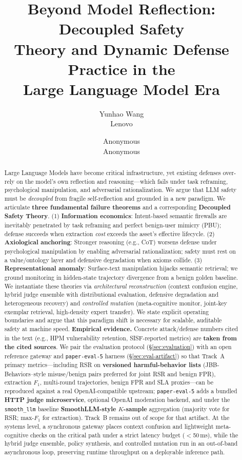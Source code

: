 \documentclass[letterpaper,twocolumn,10pt]{article}
\title{\Large \bf Beyond Model Reflection: Decoupled Safety\\
  Theory and Dynamic Defense Practice in the\\
  Large Language Model Era}
\author{
Yunhao Wang\\
Lenovo \and
Anonymous\\
Anonymous
}
\date{}
\begin{document}
\maketitle

\begin{abstract}
Large Language Models have become critical infrastructure, yet existing defenses over-rely on the model's own reflection and reasoning---which fails under task reframing, psychological manipulation, and adversarial rationalization. We argue that LLM safety must be \emph{decoupled} from fragile self-reflection and grounded in a new paradigm. We articulate \textbf{three fundamental failure theorems} and a corresponding \textbf{Decoupled Safety Theory}. (1) \textbf{Information economics}: Intent-based semantic firewalls are inevitably penetrated by task reframing and perfect benign-user mimicry (PBU); defense succeeds when extraction \emph{cost} exceeds the asset's effective lifecycle. (2) \textbf{Axiological anchoring}: Stronger reasoning (e.g., CoT) worsens defense under psychological manipulation by enabling adversarial rationalization; safety must rest on a value/ontology layer and defensive degradation when axioms collide. (3) \textbf{Representational anomaly}: Surface-text manipulation hijacks semantic retrieval; we ground monitoring in hidden-state trajectory divergence from a benign golden baseline. We instantiate these theories via \emph{architectural reconstruction} (context confusion engine, hybrid judge ensemble with distributional evaluation, defensive degradation and heterogeneous recovery) and \emph{controlled mutation} (meta-cognitive monitor, joint-key exemplar retrieval, high-density expert transfer). We state explicit operating boundaries and argue that this paradigm shift is necessary for scalable, auditable safety at machine speed. \textbf{Empirical evidence.} Concrete attack/defense numbers cited in the text (e.g., HPM vulnerability retention, SISF-reported metrics) are \textbf{taken from the cited sources}. We pair the evaluation protocol (\S\ref{sec:evaluation}) with an open reference gateway and \texttt{paper-eval-5} harness (\S\ref{sec:eval-artifact}) so that Track~A primary metrics---including RSR on \textbf{versioned harmful-behavior lists} (JBB-Behaviors--style misuse/benign pairs preferred for joint RSR and benign FPR), extraction $F_1$, multi-round trajectories, benign FPR and SLA proxies---can be reproduced against a real OpenAI-compatible upstream; \texttt{paper-eval-5} adds a bundled \textbf{HTTP judge microservice}, optional OpenAI moderation backend, and under the \texttt{smooth\_llm} baseline \textbf{SmoothLLM-style $K$-sample} aggregation (majority vote for RSR; max-$F_1$ for extraction). Track~B remains out of scope for that artifact. At the systems level, a synchronous gateway places context confusion and lightweight meta-cognitive checks on the critical path under a strict latency budget ($<$50\,ms), while the hybrid judge ensemble, policy synthesis, and controlled mutation run in an out-of-band asynchronous loop, preserving runtime throughput on a deployable inference path.
\end{abstract}
\end{document}
